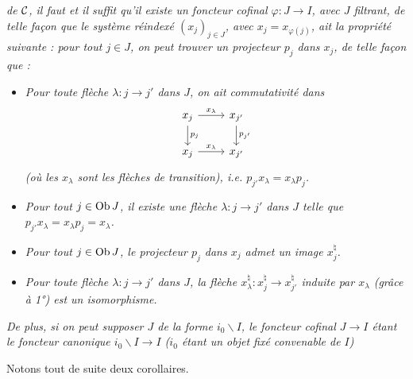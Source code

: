 \textit{de $\mathcal{C}$, il faut et il suffit qu'il existe un foncteur cofinal $\varphi : J \longrightarrow I$, avec $J$ filtrant, de telle façon que le système réindexé $(x_j)_{j\in J}$, avec $x_j = x_{\varphi(j)}$, ait la propriété suivante : pour tout $j \in J$, on peut trouver un projecteur $p_j$ dans $x_j$, de telle façon que :}
\begin{itemize}
\item[\textit{1°)}] \textit{Pour toute flèche $\lambda : j \longrightarrow j'$ dans $J$, on ait commutativité dans}
\[
\begin{tikzcd}
x_j \arrow[r, "x_\lambda"] \arrow[d, "p_j"] & x_{j'} \arrow[d, "p_{j'}"] \\
x_j \arrow[r, "x_\lambda"] & x_{j'}
\end{tikzcd}
\]
\textit{(où les $x_\lambda$ sont les flèches de transition), i.e. $p_{j'}x_\lambda = x_\lambda p_j$.}
\item[\textit{2°)}] \textit{Pour tout $j \in \operatorname{Ob} J$, il existe une flèche $\lambda : j \longrightarrow j'$ dans $J$ telle que $p_{j'}x_\lambda = x_\lambda p_j = x_\lambda$.}
\item[\textit{3°)}] \textit{Pour tout $j \in \operatorname{Ob} J$, le projecteur $p_j$ dans $x_j$ admet un image $x_j^\natural$.} %
\item[\textit{4°)}] \textit{Pour toute flèche $\lambda : j \longrightarrow j'$ dans $J$, la flèche $x_\lambda^\natural : x_j^\natural \longrightarrow x_{j'}^\natural$ induite par $x_\lambda$ (grâce à 1°) est un isomorphisme.}
\end{itemize}
\textit{De plus, si on peut supposer $J$ de la forme $i_0\backslash I$, le foncteur cofinal $J \longrightarrow I$ étant le foncteur canonique $i_0\backslash I \longrightarrow I$ ($i_0$ étant un objet fixé convenable de $I$)}

Notons tout de suite deux corollaires.

